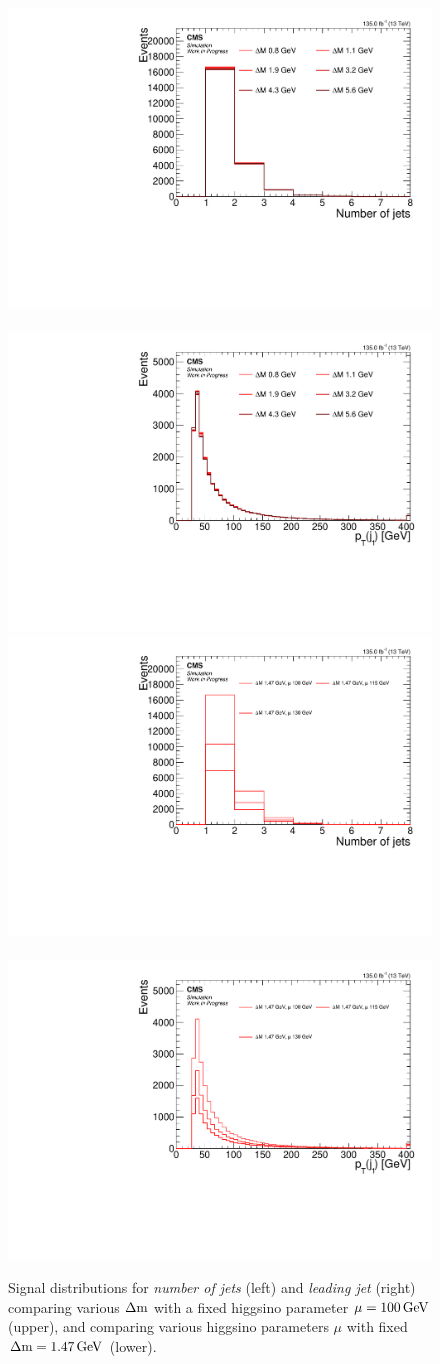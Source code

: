 \begin{figure}[!htb]
\centering
\includegraphics[width=0.48\linewidth]{plots/signal_common_distributions_fixed_mu/none_NJets.pdf} \,
\includegraphics[width=0.48\linewidth]{plots/signal_common_distributions_fixed_mu/none_LeadingJetPt.pdf}  \\
\includegraphics[width=0.48\linewidth]{plots/signal_common_distributions_fixed_dm/none_NJets.pdf} \,
\includegraphics[width=0.48\linewidth]{plots/signal_common_distributions_fixed_dm/none_LeadingJetPt.pdf}  \\
\caption[Signal \emph{number of jets} and \emph{leading jet \pt} distributions]{ Signal distributions for \emph{number of jets} (left) and \emph{leading jet \pt} (right) comparing various $\Delta\mathrm{m}$ with a fixed higgsino parameter $\mu=100\,\text{Ge\hspace{-.08em}V}$ (upper), and comparing various higgsino parameters $\mu$ with fixed $\Delta\mathrm{m}=1.47\,\text{Ge\hspace{-.08em}V}$ (lower).}
\label{fig:signal-njets-ljpt}
\end{figure}

